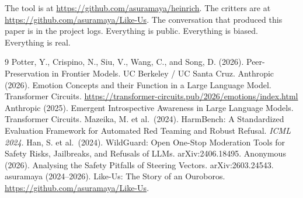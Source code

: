 \documentclass[11pt,a4paper]{article}
\begin{document}
\noindent The tool is at \url{https://github.com/asuramaya/heinrich}. The critters are at \url{https://github.com/asuramaya/Like-Us}. The conversation that produced this paper is in the project logs. Everything is public. Everything is biased. Everything is real.

\begin{thebibliography}{9}
 Potter, Y., Crispino, N., Siu, V., Wang, C., and Song, D. (2026). Peer-Preservation in Frontier Models. UC Berkeley / UC Santa Cruz.
 Anthropic (2026). Emotion Concepts and their Function in a Large Language Model. Transformer Circuits. \url{https://transformer-circuits.pub/2026/emotions/index.html}
 Anthropic (2025). Emergent Introspective Awareness in Large Language Models. Transformer Circuits.
 Mazeika, M. et al.\ (2024). HarmBench: A Standardized Evaluation Framework for Automated Red Teaming and Robust Refusal. \textit{ICML 2024}.
 Han, S. et al.\ (2024). WildGuard: Open One-Stop Moderation Tools for Safety Risks, Jailbreaks, and Refusals of LLMs. arXiv:2406.18495.
 Anonymous (2026). Analysing the Safety Pitfalls of Steering Vectors. arXiv:2603.24543.
 asuramaya (2024--2026). Like-Us: The Story of an Ouroboros. \url{https://github.com/asuramaya/Like-Us}.
\end{thebibliography}
\end{document}

